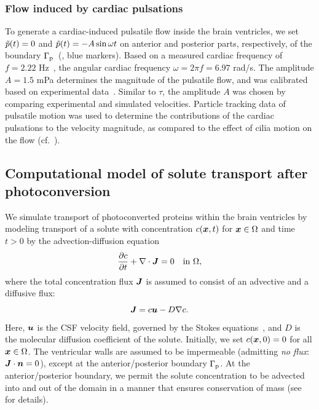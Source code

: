 \documentclass{WileyMSP-template}
\begin{document}
\subsubsection{Flow induced by cardiac pulsations}
To generate a cardiac-induced pulsatile flow inside the brain ventricles, we set $\Tilde{p}(t)=0$ and
$\Tilde{p}(t)=-A\sin{\omega t}$ on anterior and posterior parts, respectively, of the
boundary $\Gamma_{\mathrm{p}}$~(, blue markers).
Based on a measured cardiac frequency of $f=2.22$ Hz~\cite{Olstad2019CiliaryDevelopment},
the angular cardiac frequency $\omega=2\pi f=6.97$ rad/s.
The amplitude $A=1.5$ mPa determines the magnitude of the pulsatile flow,
and was calibrated based on experimental data~\cite{Olstad2019CiliaryDevelopment}.
Similar to $\tau$, the amplitude $A$ was chosen by comparing experimental and simulated velocities.
Particle tracking data of pulsatile motion was used to determine the contributions of the
cardiac pulsations to the velocity magnitude,
as compared to the effect of cilia motion on the flow (cf.~).

\subsection{Computational model of solute transport after photoconversion}
We simulate transport of photoconverted proteins within the brain ventricles by
modeling transport of a solute with concentration $c(\bm{x}, t)$ for $\bm{x}\in\Omega$ and
time $t > 0$ by the advection-diffusion equation
\begin{equation}
    \frac{\partial c}{\partial t} + \nabla\cdot\bm{J} = 0 \quad \text{in } \Omega,
    \label{eq:adv_diff_strong}
\end{equation}
where the total concentration flux $\bm{J}$ is assumed to consist of an advective and a diffusive flux:
\begin{equation*}
    \bm{J} = c\bm{u} - D\nabla c .
\end{equation*}
Here, $\bm{u}$ is the CSF velocity field, governed by the Stokes equations~,
and $D$ is the molecular diffusion coefficient of the solute.
Initially, we set $c(\bm{x}, 0)=0$ for all $\bm{x}\in\Omega$.
The ventricular walls are assumed to be impermeable (admitting \emph{no flux}: $\bm{J}\cdot\bm{n}=0$),
except at the anterior/posterior boundary $\Gamma_{\mathrm{p}}$.
At the anterior/posterior boundary, we permit the solute concentration to be advected into
and out of the domain in a manner that ensures conservation of mass
(see~ for details).
\end{document}
